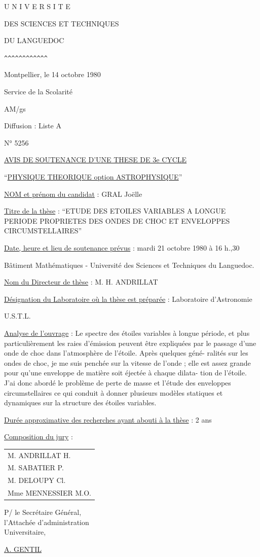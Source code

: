 
U N I V E R S I T E

DES SCIENCES ET TECHNIQUES

DU LANGUEDOC

\verb|^^^^^^^^^^^^|

\hfill Montpellier, le 14 octobre 1980

Service de la Scolarité

AM/gs

Diffusion : Liste A

N° 5256

\begin{center}
\uline{AVIS DE SOUTENANCE D'UNE THESE DE 3e CYCLE}

``\uline{PHYSIQUE THEORIQUE option ASTROPHYSIQUE}''
\end{center}

\uline{NOM et prénom du candidat} : GRAL Joëlle

\uline{Titre de la thèse} : ``ETUDE DES ETOILES VARIABLES A LONGUE PERIODE PROPRIETES DES ONDES DE CHOC ET ENVELOPPES CIRCUMSTELLAIRES''

\uline{Date, heure et lieu de soutenance prévus} : mardi 21 octobre 1980 à 16 h.,30

Bâtiment Mathématiques - Université des Sciences et Techniques du Languedoc.

\uline{Nom du Directeur de thèse} : M. H. ANDRILLAT

\uline{Désignation du Laboratoire où la thèse est préparée} : Laboratoire d'Astronomie

\hfill U.S.T.L.

\uline{Analyse de l'ouvrage} : Le spectre des étoiles variables à longue période, et plus particulièrement les raies d'émission peuvent être expliquées par le passage d'une onde de choc dans l'atmosphère de l'étoile. Après quelques géné-\newline
ralités sur les ondes de choc, je me suis penchée sur la vitesse de l'onde ; elle est assez grande pour qu'une enveloppe de matière soit éjectée à chaque dilata-\newline
tion de l'étoile. J'ai donc abordé le problème de perte de masse et l'étude des enveloppes circumstellaires ce qui conduit à donner plusieurs modèles statiques et dynamiques sur la structure des étoiles variables.

\uline{Durée approximative des recherches ayant abouti à la thèse} : 2 ans

\uline{Composition du jury} :
\begin{tabular}{l}
M. ANDRILLAT H.\\
M. SABATIER P.\\
M. DELOUPY Cl.\\
Mme MENNESSIER M.O.
\end{tabular}

\begin{flushright}
P/ le Secrétaire Général,\\
l'Attachée d'administration\\
Universitaire,


\uline{A. GENTIL}
\end{flushright}
